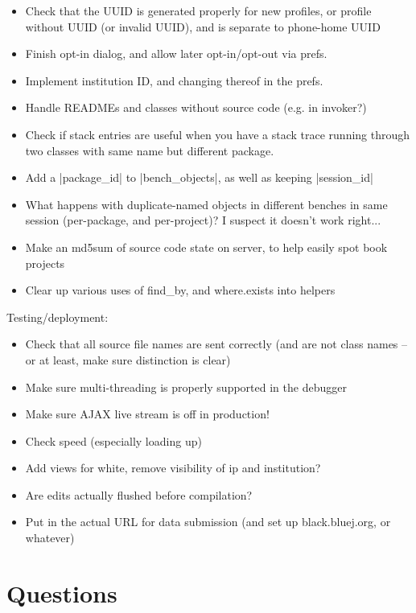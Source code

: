 \documentclass{book}
\begin{document}
\begin{itemize}
\item Check that the UUID is generated properly for new profiles, or profile without
UUID (or invalid UUID), and is separate to phone-home UUID
\item Finish opt-in dialog, and allow later opt-in/opt-out via prefs.
\item Implement institution ID, and changing thereof in the prefs.
\item Handle READMEs and classes without source code (e.g. in invoker?)
\item Check if stack entries are useful when you have a stack trace
  running through two classes with same name but different package.
\item Add a |package_id| to |bench_objects|, as well as keeping |session_id|
\item What happens with duplicate-named objects in different benches in same session
  (per-package, and per-project)?  I suspect it doesn't work right...
\item Make an md5sum of source code state on server, to help easily spot book projects
\item Clear up various uses of find_by, and where.exists into helpers
\end{itemize}

Testing/deployment:

\begin{itemize}
\item Check that all source file names are sent correctly (and are not class
  names -- or at least, make sure distinction is clear)
\item Make sure multi-threading is properly supported in the debugger
\item Make sure AJAX live stream is off in production!
\item Check speed (especially loading up)
\item Add views for white, remove visibility of ip and institution?
\item Are edits actually flushed before compilation?
\item Put in the actual URL for data submission (and set up black.bluej.org,
  or whatever)
\end{itemize}

\section{Questions}
\end{document}
